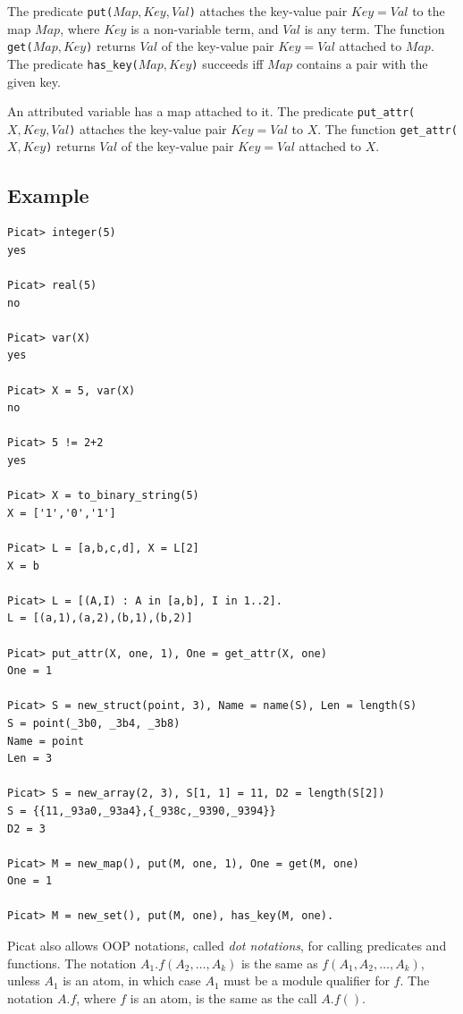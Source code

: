 The predicate \texttt{put($Map, Key, Val$)} attaches the key-value pair \texttt{$Key$$=$$Val$} to the map \texttt{$Map$}, where \texttt{$Key$} is a non-variable term, and \texttt{$Val$} is any term. The function \texttt{get($Map, Key$)} returns \texttt{$Val$} of the key-value pair \texttt{$Key$$=$$Val$} attached to \texttt{$Map$}. The predicate \texttt{has\_key($Map, Key$)} succeeds iff $Map$ contains a pair with the given key.

An attributed variable has a map attached to it. The predicate \texttt{put\_attr($X, Key, Val$)} attaches the key-value pair \texttt{$Key$$=$$Val$} to \texttt{$X$}. The function \texttt{get\_attr($X, Key$)} returns \texttt{$Val$} of the key-value pair \texttt{$Key$$=$$Val$} attached to \texttt{$X$}. 

\subsection*{Example}
\begin{verbatim}
Picat> integer(5)
yes

Picat> real(5)
no

Picat> var(X)
yes

Picat> X = 5, var(X)
no

Picat> 5 != 2+2
yes

Picat> X = to_binary_string(5)
X = ['1','0','1']

Picat> L = [a,b,c,d], X = L[2]
X = b

Picat> L = [(A,I) : A in [a,b], I in 1..2].
L = [(a,1),(a,2),(b,1),(b,2)]

Picat> put_attr(X, one, 1), One = get_attr(X, one)
One = 1

Picat> S = new_struct(point, 3), Name = name(S), Len = length(S)
S = point(_3b0, _3b4, _3b8)
Name = point
Len = 3

Picat> S = new_array(2, 3), S[1, 1] = 11, D2 = length(S[2])
S = {{11,_93a0,_93a4},{_938c,_9390,_9394}}
D2 = 3

Picat> M = new_map(), put(M, one, 1), One = get(M, one)
One = 1

Picat> M = new_set(), put(M, one), has_key(M, one).
\end{verbatim}

Picat also allows OOP notations, called \textit{dot notations}, for calling predicates and functions. The notation \texttt{$A_1.f(A_2, \ldots, A_k)$} is the same as \texttt{$f(A_1, A_2, \ldots, A_k)$}, unless $A_1$ is an atom, in which case $A_1$ must be a module qualifier for $f$.  The notation $A.f$, where $f$ is an atom, is the same as the call \texttt{$A.f()$}. 

